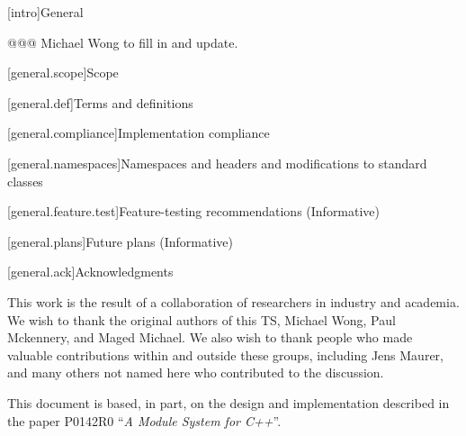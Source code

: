 
[intro]{General}

@@@ Michael Wong to fill in and update.

[general.scope]{Scope}

[general.def]{Terms and definitions}

[general.compliance]{Implementation compliance}

[general.namespaces]{Namespaces and headers and modifications to standard classes}

[general.feature.test]{Feature-testing recommendations (Informative)}

[general.plans]{Future plans (Informative)}

[general.ack]{Acknowledgments}

This work is the result of a collaboration of researchers in industry and academia. We wish to thank the
original authors of this TS, Michael Wong, Paul Mckennery, and Maged Michael. We also wish to thank people
who made valuable contributions within and outside these groups, including Jens Maurer, and many others not named
here who contributed to the discussion.



\pnum
This document is based, in part, on the design and implementation
described in the paper P0142R0 ``\emph{A Module System for C++}''.

